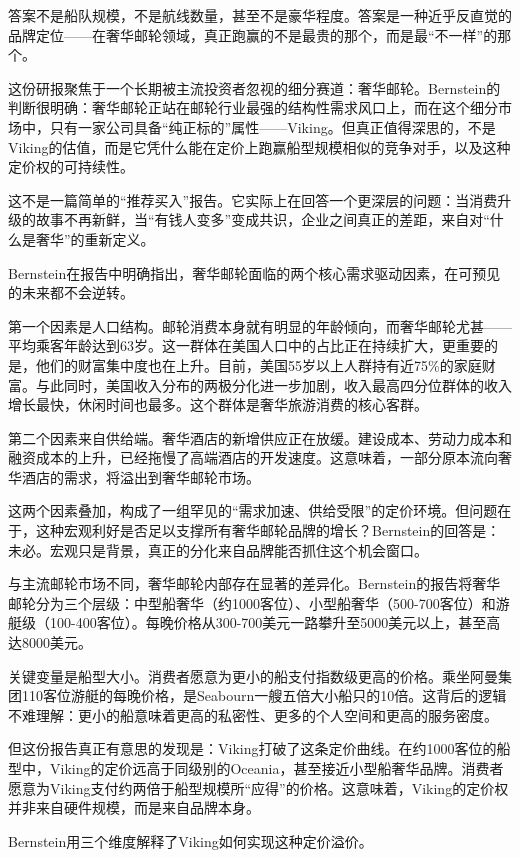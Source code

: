 \documentclass[11pt]{ctexart}
\begin{document}
答案不是船队规模，不是航线数量，甚至不是豪华程度。答案是一种近乎反直觉的品牌定位——在奢华邮轮领域，真正跑赢的不是最贵的那个，而是最“不一样”的那个。

这份研报聚焦于一个长期被主流投资者忽视的细分赛道：奢华邮轮。Bernstein的判断很明确：奢华邮轮正站在邮轮行业最强的结构性需求风口上，而在这个细分市场中，只有一家公司具备“纯正标的”属性——Viking。但真正值得深思的，不是Viking的估值，而是它凭什么能在定价上跑赢船型规模相似的竞争对手，以及这种定价权的可持续性。

这不是一篇简单的“推荐买入”报告。它实际上在回答一个更深层的问题：当消费升级的故事不再新鲜，当“有钱人变多”变成共识，企业之间真正的差距，来自对“什么是奢华”的重新定义。

Bernstein在报告中明确指出，奢华邮轮面临的两个核心需求驱动因素，在可预见的未来都不会逆转。

第一个因素是人口结构。邮轮消费本身就有明显的年龄倾向，而奢华邮轮尤甚——平均乘客年龄达到63岁。这一群体在美国人口中的占比正在持续扩大，更重要的是，他们的财富集中度也在上升。目前，美国55岁以上人群持有近75\%的家庭财富。与此同时，美国收入分布的两极分化进一步加剧，收入最高四分位群体的收入增长最快，休闲时间也最多。这个群体是奢华旅游消费的核心客群。

第二个因素来自供给端。奢华酒店的新增供应正在放缓。建设成本、劳动力成本和融资成本的上升，已经拖慢了高端酒店的开发速度。这意味着，一部分原本流向奢华酒店的需求，将溢出到奢华邮轮市场。

这两个因素叠加，构成了一组罕见的“需求加速、供给受限”的定价环境。但问题在于，这种宏观利好是否足以支撑所有奢华邮轮品牌的增长？Bernstein的回答是：未必。宏观只是背景，真正的分化来自品牌能否抓住这个机会窗口。

与主流邮轮市场不同，奢华邮轮内部存在显著的差异化。Bernstein的报告将奢华邮轮分为三个层级：中型船奢华（约1000客位）、小型船奢华（500-700客位）和游艇级（100-400客位）。每晚价格从300-700美元一路攀升至5000美元以上，甚至高达8000美元。

关键变量是船型大小。消费者愿意为更小的船支付指数级更高的价格。乘坐阿曼集团110客位游艇的每晚价格，是Seabourn一艘五倍大小船只的10倍。这背后的逻辑不难理解：更小的船意味着更高的私密性、更多的个人空间和更高的服务密度。

但这份报告真正有意思的发现是：Viking打破了这条定价曲线。在约1000客位的船型中，Viking的定价远高于同级别的Oceania，甚至接近小型船奢华品牌。消费者愿意为Viking支付约两倍于船型规模所“应得”的价格。这意味着，Viking的定价权并非来自硬件规模，而是来自品牌本身。

Bernstein用三个维度解释了Viking如何实现这种定价溢价。
\end{document}
